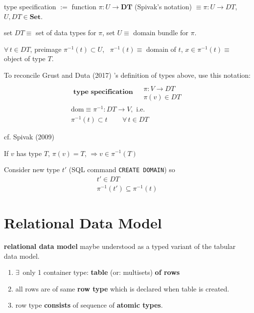 \begin{definition}
	type specification $:= $ function $\pi : U \to \mathbf{DT}$ (Spivak's notation) $ \equiv \pi : U \to DT$, $U, DT \in \textbf{Set}$.
	
	set $DT \equiv $ set of data types for $\pi$, set $U \equiv $ domain bundle for $\pi$.
	
	$\forall \, t \in DT$, preimage $\pi^{-1}(t) \subset U$, \, $\pi^{-1}(t) \equiv $ domain of $t$, $x \in \pi^{-1}(t) \equiv $ object of type $T$.

	To reconcile Grust and Duta (2017) \cite{agat:GrDu2017}'s definition of types above, use this notation:
	\begin{equation}
	\boxed{
	\begin{gathered}
	\textbf{ type specification } \begin{aligned} & \quad \\ 
	& \pi : V \to DT \\ 
	& \pi(v) \in DT \end{aligned} \\
	\text{dom} \equiv \pi^{-1}: DT \to V, \text{ i.e. } \\
	\pi^{-1}(t) \subset t \qquad \, \forall \, t \in DT  
	\end{gathered}}
	\end{equation}
\end{definition}
	cf. Spivak (2009) \cite{agat:Spiv2009}

\begin{corollary}
	If $v$ has type $T$, $\pi(v) = T$, $\Longrightarrow v \in \pi^{-1}(T)$
\end{corollary}

\begin{proposition}
	Consider new type $t'$ (SQL command \texttt{CREATE DOMAIN}) so 
	\begin{equation}
	\begin{gathered}
	t' \in DT \\
	\pi^{-1}(t') \subseteq \pi^{-1}(t)
	\end{gathered}
	\end{equation}
\end{proposition}


\section{Relational Data Model}

	\textbf{relational data model} maybe understood as a typed variant of the tabular data model. 
	\begin{enumerate}
		\item $\exists \, $ only 1 container type: \textbf{table} (or: multisets) \textbf{ of rows}
		\item all rows are of same \textbf{row type} which is declared when table is created.
		\item row type \textbf{consists} of sequence of \textbf{atomic types}.
	\end{enumerate}

